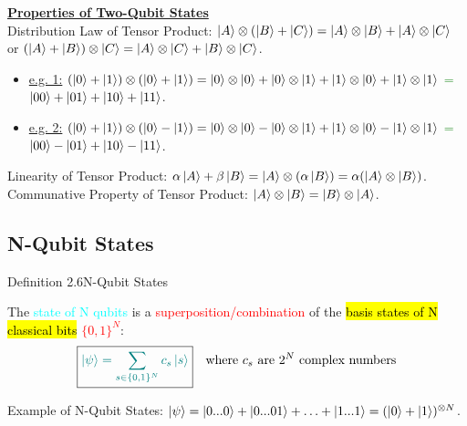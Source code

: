 \documentclass{book}
\begin{document}
\uline{\textbf{Properties of Two-Qubit States}}\\
Distribution Law of Tensor Product: \textcolor{blue}{\(\ket{A} \otimes (\ket{B} + \ket{C}) = \ket{A} \otimes \ket{B} + \ket{A} \otimes \ket{C}\)} or \textcolor{blue}{\((\ket{A} + \ket{B}) \otimes \ket{C} = \ket{A} \otimes \ket{C} + \ket{B} \otimes \ket{C}\)}.
\begin{itemize}
    \item \uline{e.g. 1:} \textcolor{forestgreen}{\((\ket{0} + \ket{1}) \otimes (\ket{0} + \ket{1}) = \ket{0} \otimes \ket{0} + \ket{0} \otimes \ket{1} + \ket{1} \otimes \ket{0} + \ket{1} \otimes \ket{1}\) = \(\ket{00} + \ket{01} + \ket{10} + \ket{11}\)}.
    \item \uline{e.g. 2:} \textcolor{forestgreen}{\((\ket{0} + \ket{1}) \otimes (\ket{0} - \ket{1}) = \ket{0} \otimes \ket{0} - \ket{0} \otimes \ket{1} + \ket{1} \otimes \ket{0} - \ket{1} \otimes \ket{1}\) = \(\ket{00} - \ket{01} + \ket{10} - \ket{11}\)}.
\end{itemize}
Linearity of Tensor Product: \textcolor{blue}{\(\alpha \ket{A} + \beta \ket{B} = \ket{A} \otimes (\alpha \ket{B}) = \alpha (\ket{A} \otimes \ket{B})\)}.\\
Communative Property of Tensor Product: \textcolor{blue}{\(\ket{A} \otimes \ket{B} = \ket{B} \otimes \ket{A}\)}.
\subsection{N-Qubit States}
\begin{defBox}{Definition 2.6}{N-Qubit States}
    \raggedright
    The \textcolor{cyan}{state of N qubits} is a \textcolor{red}{superposition/combination} of the \hl{basis states of N classical bits} \textcolor{red}{$\{0, 1\}^N$}:
    \[
    \boxed{\textcolor{teal}{\ket{\psi} = \sum_{s \in \{0, 1\}^N} c_s \ket{s}}} \quad \text{where } c_s \text{ are } 2^N \text{ complex numbers}
    \]
\end{defBox}
Example of N-Qubit States: \textcolor{forestgreen}{\(\ket{\psi} = \ket{0...0} + \ket{0...01} + \ldots + \ket{1...1} = (\ket{0} + \ket{1})^{\otimes N}\)}.
\end{document}
